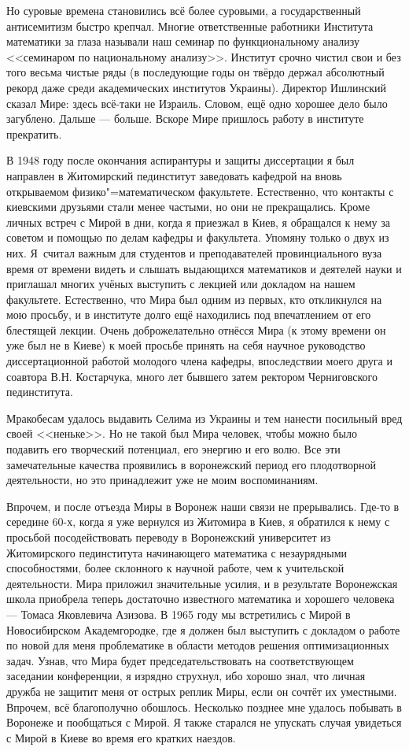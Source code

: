 Но суровые времена становились всё более суровыми, а государственный антисемитизм быстро крепчал. Многие ответственные работники Института математики за глаза называли наш семинар по функциональному анализу <<семинаром по национальному анализу>>. Институт срочно чистил свои и без того весьма чистые ряды (в последующие годы он твёрдо держал абсолютный рекорд даже среди академических институтов Украины). Директор Ишлинский сказал Мире: здесь всё-таки не Израиль. Словом, ещё одно хорошее дело было загублено. Дальше --- больше. Вскоре Мире пришлось работу в институте прекратить.

В 1948 году после окончания аспирантуры и защиты диссертации я был направлен
в Житомирский пединститут заведовать кафедрой на вновь открываемом фи\-зи\-ко"=ма\-те\-ма\-ти\-че\-с\-ком факультете.
Естественно, что контакты с киевскими друзьями стали менее частыми, но они не прекращались.
Кроме личных встреч с Мирой в дни, когда я приезжал в Киев,
я обращался к нему за советом и помощью по делам кафедры и факультета. Упомяну только о двух из них.
Я~считал важным для студентов и преподавателей провинциального вуза время от времени видеть и слышать выдающихся математиков и деятелей науки и приглашал многих учёных выступить с лекцией или докладом на нашем факультете. Естественно, что Мира был одним из первых, кто откликнулся на мою просьбу, и в институте долго ещё находились под впечатлением от его блестящей лекции. Очень доброжелательно отнёсся Мира (к этому времени он уже был не в Киеве) к моей просьбе принять на себя научное руководство диссертационной работой молодого члена кафедры, впоследствии моего друга и соавтора В.Н. Костарчука, много лет бывшего затем ректором Черниговского пединститута.

Мракобесам удалось выдавить Селима из Украины и тем нанести посильный вред своей <<неньке>>. Но не такой был Мира человек, чтобы можно было подавить его творческий потенциал, его энергию и его волю. Все эти замечательные качества проявились в воронежский период его плодотворной деятельности, но это принадлежит уже не моим воспоминаниям.

Впрочем, и после отъезда Миры в Воронеж наши связи не прерывались. Где-то в середине 60-х, когда я уже вернулся из Житомира в Киев, я обратился к нему с просьбой посодействовать переводу в Воронежский университет из Житомирского пединститута начинающего математика с незаурядными способностями, более склонного к научной работе, чем к учительской деятельности. Мира приложил значительные усилия, и в результате Воронежская школа приобрела теперь достаточно известного математика и хорошего человека --- Томаса Яковлевича Азизова. В 1965 году мы встретились с Мирой в Новосибирском Академгородке, где я должен был выступить с докладом о работе по новой для меня проблематике в области методов решения оптимизационных задач. Узнав, что Мира будет председательствовать на соответствующем заседании конференции, я изрядно струхнул, ибо хорошо знал, что личная дружба не защитит меня от острых реплик Миры, если он сочтёт их уместными. Впрочем, всё благополучно обошлось. Несколько позднее мне удалось побывать в Воронеже и пообщаться с Мирой. Я также старался не упускать случая увидеться с Мирой в Киеве во время его кратких наездов.

